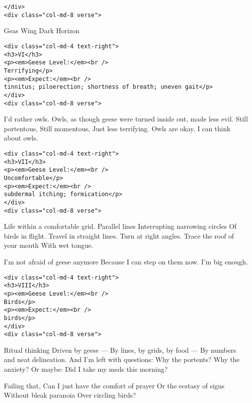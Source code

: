 \begin{verbatim}
</div>
<div class="col-md-8 verse">
\end{verbatim}

Geas Wing Dark Horizon

\begin{verbatim}
<div class="col-md-4 text-right">
<h3>VI</h3>
<p><em>Geese Level:</em><br />
Terrifying</p>
<p><em>Expect:</em><br />
tinnitus; piloerection; shortness of breath; uneven gait</p>
</div>
<div class="col-md-8 verse">
\end{verbatim}

I'd rather owls. Owls, as though geese were turned inside out, made less evil. Still portentous, Still momentous, Just less terrifying. Owls are okay. I can think about owls.

\begin{verbatim}
<div class="col-md-4 text-right">
<h3>VII</h3>
<p><em>Geese Level:</em><br />
Uncomfortable</p>
<p><em>Expect:</em><br />
subdermal itching; formication</p>
</div>
<div class="col-md-8 verse">
\end{verbatim}

Life within a comfortable grid. Parallel lines Interrupting narrowing circles Of birds in flight. Travel in straight lines. Turn at right angles. Trace the roof of your mouth With wet tongue.

I'm not afraid of geese anymore Because I can step on them now. I'm big enough.

\begin{verbatim}
<div class="col-md-4 text-right">
<h3>VIII</h3>
<p><em>Geese Level:</em><br />
Birds</p>
<p><em>Expect:</em><br />
birds</p>
</div>
<div class="col-md-8 verse">
\end{verbatim}

Ritual thinking Driven by geese --- By lines, by grids, by food --- By numbers and neat delineation. And I'm left with questions: Why the portents? Why the anxiety? Or maybe: Did I take my meds this morning?

Failing that, Can I just have the comfort of prayer Or the ecstasy of signs Without bleak paranoia Over circling birds?
